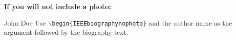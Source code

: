 \documentclass[lettersize,journal]{IEEEtran}
\begin{document}
\vspace{11pt}

\bf{If you will not include a photo:}\vspace{-33pt}
\begin{IEEEbiographynophoto}{John Doe}
  Use $\backslash${\tt{begin\{IEEEbiographynophoto\}}} and the author name as the argument followed by the biography text.
\end{IEEEbiographynophoto}

\vfill
\end{document}
